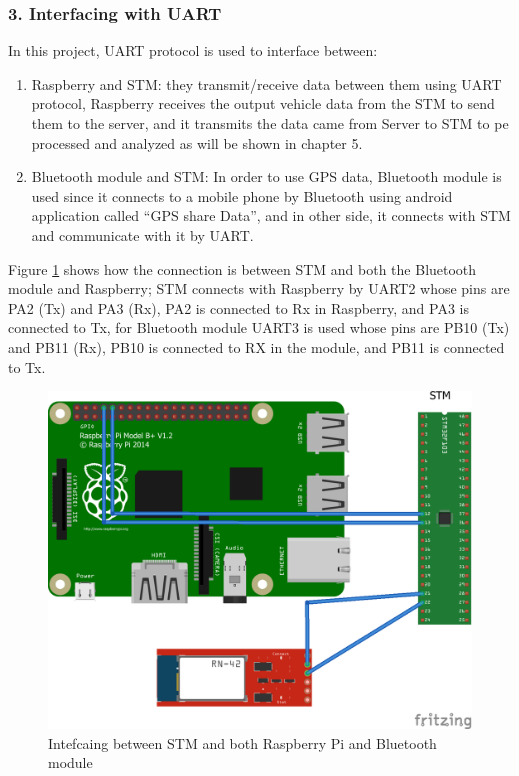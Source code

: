 \subsubsection{3. Interfacing with UART}
In this project, UART protocol is used to interface between:
\begin{enumerate}
    \item Raspberry and STM: they transmit/receive data between them using UART protocol, Raspberry receives the output vehicle data from the STM to send them to the server, and it transmits the data came from Server to STM to pe processed and analyzed as will be shown in chapter 5.
    \item Bluetooth module and STM: In order to use GPS data, Bluetooth module is used since it connects to a mobile phone by Bluetooth using android application called “GPS share Data”, and in other side, it connects with STM and communicate with it by UART.
\end{enumerate}

Figure \ref{fig:interface-stm-rasp-bluetooth} shows how the connection is between STM and both the Bluetooth module and Raspberry; STM connects with Raspberry by UART2 whose pins are PA2 (Tx) and PA3 (Rx), PA2 is connected to Rx in Raspberry, and PA3 is connected to Tx, for Bluetooth module UART3 is used whose pins are PB10 (Tx) and PB11 (Rx), PB10 is connected to RX in the module, and PB11 is connected to Tx.

\begin{figure}[h]
\includegraphics[width=\textwidth]{figure/3_3.png}
\caption{Intefcaing between STM and both Raspberry Pi and Bluetooth module}
\label{fig:interface-stm-rasp-bluetooth}
\centering
\end{figure}

